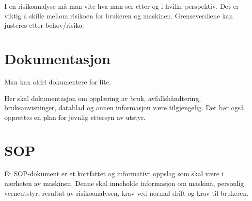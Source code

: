 \documentclass{artikel1}
\begin{document}
I en risikoanalyse må man vite hva man ser etter og i hvilke perspektiv. Det er viktig å skille mellom risikoen for brukeren og maskinen. Grenseverdiene kan justeres etter behov/risiko.


\section*{Dokumentasjon}
Man kan aldri dokumentere for lite.

Her skal dokumentasjon om opplæring av bruk, avfallshåndtering, bruksanvisninger, datablad og annen informasjon være tilgjengelig. Det bør også opprettes en plan for jevnlig ettersyn av utstyr.


\section*{SOP}
Et SOP-dokument er et kortfattet og informativt oppslag som skal være i nærheten av maskinen. Denne skal inneholde informasjon om maskina, personlig verneutstyr, resultat av risikoanalysen, krav ved normal drift og krav til brukeren.
\end{document}
